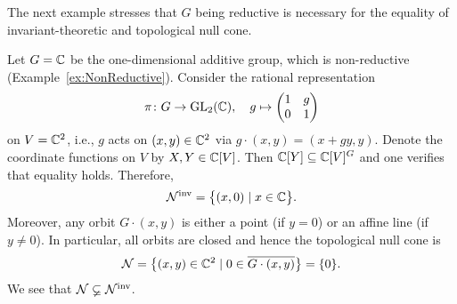 The next example stresses that $G$ being reductive is necessary for the equality of invariant-theoretic and topological null cone.

\begin{example}\label{ex:NonReductiveDifferentNullCones}
	Let $G = \mathbb C$ be the  one-dimensional additive group, which is non-reductive (Example~\ref{ex:NonReductive}). Consider the rational representation
		\[ \pi \colon G \to \operatorname{GL}_2(\mathbb C), \quad g \mapsto \begin{pmatrix} 1 & g \\ 0 & 1 \end{pmatrix} \]
	on $V = \mathbb C^2$, i.e., $g$ acts on $(x,y) \in \mathbb C^2$ via $g \cdot (x,y) = (x + gy, y)$. Denote the coordinate functions on $V$ by $X,Y \in \mathbb C[V]$. Then $\mathbb C[Y] \subseteq \mathbb C[V]^G$ and one verifies that equality holds. Therefore, 
		\[ \mathcal{N}^{\text{inv}} = \big\{ (x,0) \mid x \in \mathbb C \big\}. \]
	Moreover, any orbit $G \cdot (x,y)$ is either a point (if $y=0$) or an affine line (if $y \neq 0$). In particular, all orbits are closed and hence the topological null cone is
		\[ \mathcal{N} = \big\{ (x,y) \in \mathbb C^2 \mid 0 \in \overline{G \cdot (x,y)} \big\} = \{ 0 \} . \]
	We see that $\mathcal{N} \varsubsetneq \mathcal{N}^{\text{inv}}$.
	\hfill\exSymbol
\end{example}









